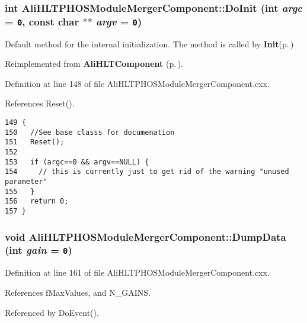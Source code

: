 \subsubsection{\setlength{\rightskip}{0pt plus 5cm}int Ali\-HLTPHOSModule\-Merger\-Component::Do\-Init (int {\em argc} = {\tt 0}, const char $\ast$$\ast$ {\em argv} = {\tt 0})\hspace{0.3cm}{\tt  [virtual]}}\label{classAliHLTPHOSModuleMergerComponent_a4}


Default method for the internal initialization. The method is called by {\bf Init}{\rm (p.\,\pageref{classAliHLTProcessor_a2})} 

Reimplemented from {\bf Ali\-HLTComponent} {\rm (p.\,\pageref{classAliHLTComponent_b5})}.

Definition at line 148 of file Ali\-HLTPHOSModule\-Merger\-Component.cxx.

References Reset().

\footnotesize\begin{verbatim}149 {
150   //See base classs for documenation
151   Reset();
152 
153   if (argc==0 && argv==NULL) {
154     // this is currently just to get rid of the warning "unused parameter"
155   }
156   return 0;
157 }
\end{verbatim}\normalsize 


\subsubsection{\setlength{\rightskip}{0pt plus 5cm}void Ali\-HLTPHOSModule\-Merger\-Component::Dump\-Data (int {\em gain} = {\tt 0})}\label{classAliHLTPHOSModuleMergerComponent_a8}




Definition at line 161 of file Ali\-HLTPHOSModule\-Merger\-Component.cxx.

References f\-Max\-Values, and N\_\-GAINS.

Referenced by Do\-Event().

